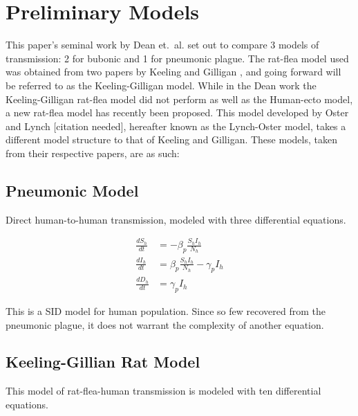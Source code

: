 \documentclass [letterpaper, 12pt] {article}
\begin{document}
%


\pagebreak

\section {Preliminary Models}
This paper's seminal work by Dean et.\ al. \cite{Dean1304} set out to compare 3 models of
transmission: 2 for bubonic and 1 for pneumonic plague. The rat-flea model used was obtained from two papers by Keeling and Gilligan \cite{keeling_gilligan_zoonosis} \cite{keeling2000}, and going forward will be referred to as the Keeling-Gilligan model. While in the Dean work the Keeling-Gilligan rat-flea model did not perform as well as the Human-ecto model, a new rat-flea model has recently been proposed. This model developed by Oster and Lynch [citation needed], hereafter known as the Lynch-Oster model, takes a different model structure to that of Keeling and Gilligan. These models, taken from their respective papers, are as such:

\subsection {Pneumonic Model}
Direct human-to-human transmission, modeled with three differential equations.

\begin{equation}
	\begin{align*}
		\frac{dS_h}{dt} &= - \beta_p \frac{S_h I_h}{N_h} \\
		\frac{dI_h}{dt} &= \beta_p \frac{S_h I_h}{N_h} - \gamma_p I_h \\
		\frac{dD_h}{dt} &= \gamma_p I_h
	\end{align*}
\end{equation}

This is a SID model for human population. Since so few recovered from the pneumonic plague, it does not warrant the complexity of another equation.

\subsection {Keeling-Gillian Rat Model}
This model of rat-flea-human transmission is modeled with ten differential equations.
\end{document}

